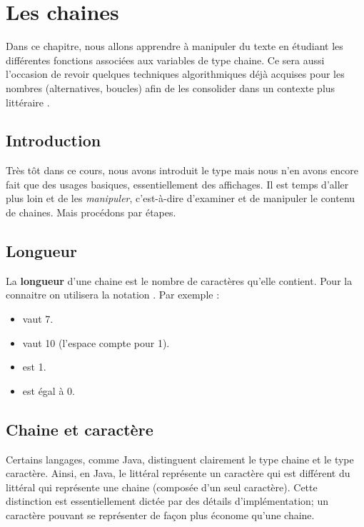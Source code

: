 \chapter{Les chaines}

	Dans ce chapitre, 
	nous allons apprendre à manipuler du texte 
	en étudiant les différentes fonctions associées 
	aux variables de type chaine. 
	Ce sera aussi l'occasion de revoir quelques techniques algorithmiques 
	déjà acquises pour les nombres (alternatives, boucles) 
	afin de les consolider dans un contexte plus \og littéraire \fg.
	
\section{Introduction}

	Très tôt dans ce cours,
	nous avons introduit le type 
	mais nous n'en avons encore fait que des usages basiques,
	essentiellement des affichages.
	Il est temps d'aller plus loin et de les \emph{manipuler},
	c'est-à-dire d'examiner et de manipuler le contenu de chaines. 
	Mais procédons par étapes.
	
\section{Longueur}
	
	La \textbf{longueur} d'une chaine est le nombre de caractères
	qu'elle contient. 
	Pour la connaitre on utilisera la notation .
	Par exemple :
	\begin{itemize}
	\item {} vaut 7.
	\item {} vaut 10 (l'espace compte pour 1).
	\item {} est 1.
	\item {} est égal à 0.
	\end{itemize}
	
\section{Chaine et caractère}

	Certains langages, comme Java,
	distinguent clairement le type chaine et le type caractère.
	Ainsi, en Java, le littéral  représente un caractère
	qui est différent du littéral  qui représente une chaine
	(composée d'un seul caractère).
	Cette distinction est essentiellement dictée par des détails
	d'implémentation; un caractère pouvant se représenter
	de façon plus économe qu'une chaine.

